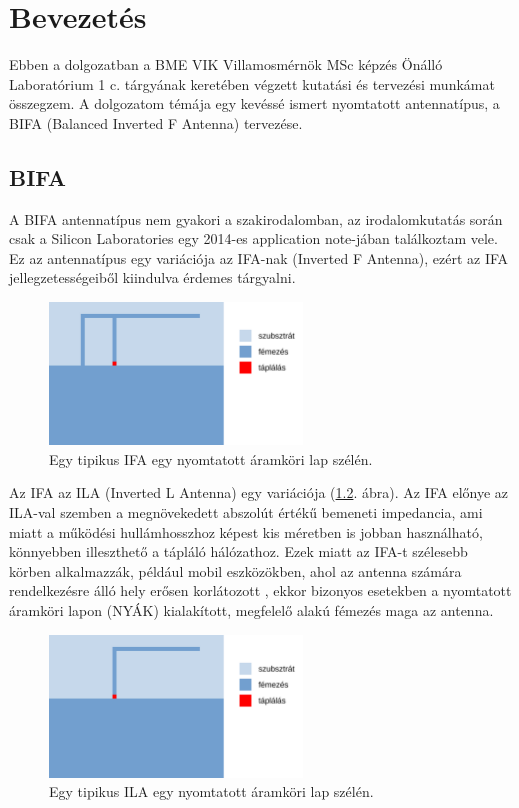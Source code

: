 \chapter{Bevezetés}
Ebben a dolgozatban a BME VIK Villamosmérnök MSc képzés Önálló Laboratórium 1 c. tárgyának keretében végzett kutatási és tervezési munkámat összegzem. A dolgozatom témája egy kevéssé ismert nyomtatott antennatípus, a BIFA (Balanced Inverted F Antenna) tervezése.
\section{BIFA}
\par A BIFA antennatípus nem gyakori a szakirodalomban, az irodalomkutatás során csak a Silicon Laboratories egy 2014-es application note-jában \cite{an847} találkoztam vele. Ez az antennatípus egy variációja az IFA-nak (Inverted F Antenna), ezért az IFA jellegzetességeiből kiindulva érdemes tárgyalni.
\begin{figure}[h]
	\centering
	\includegraphics[width=0.6\textwidth]{kep/tipikus_ifa.pdf}
	\caption{Egy tipikus IFA egy nyomtatott áramköri lap szélén.}
	\label{fig:tipikus_ifa}
\end{figure}
\par Az IFA az ILA (Inverted L Antenna)  egy variációja (\ref{fig:tipikus_ila}. ábra). Az IFA előnye az ILA-val szemben a megnövekedett abszolút értékű bemeneti impedancia, ami miatt a működési hullámhosszhoz képest kis méretben is jobban használható, könnyebben illeszthető a tápláló hálózathoz. Ezek miatt az IFA-t szélesebb körben alkalmazzák, például mobil eszközökben, ahol az antenna számára rendelkezésre álló hely erősen korlátozott \cite{multi-band}, ekkor bizonyos esetekben a nyomtatott áramköri lapon (NYÁK) kialakított, megfelelő alakú fémezés maga az antenna.
\begin{figure}[h]
	\centering
	\includegraphics[width=0.6\textwidth]{kep/tipikus_ila.pdf}
	\caption{Egy tipikus ILA egy nyomtatott áramköri lap szélén.}
	\label{fig:tipikus_ila}
\end{figure}
